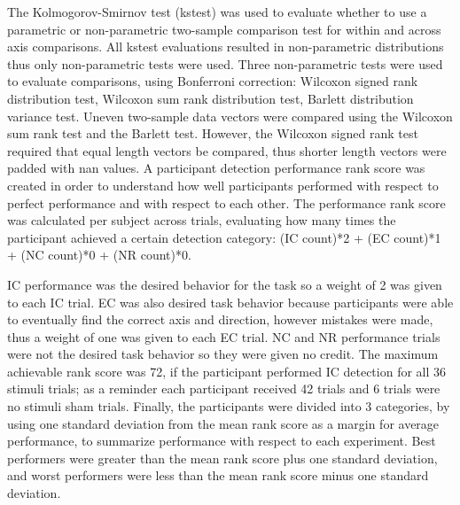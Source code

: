 \documentclass[11pt, onecolumn]{article}
\begin{document}
The Kolmogorov-Smirnov test (kstest) was used to evaluate whether to use a parametric or non-parametric two-sample comparison test for within and across axis comparisons.  All kstest evaluations resulted in non-parametric distributions thus only non-parametric tests were used.  Three non-parametric tests were used to evaluate comparisons, using Bonferroni correction: Wilcoxon signed rank distribution test, Wilcoxon sum rank distribution test, Barlett distribution variance test.  Uneven two-sample data vectors were compared using the Wilcoxon sum rank test and the Barlett test.  However, the Wilcoxon signed rank test required that equal length vectors be compared, thus shorter length vectors were padded with nan values.
A participant detection performance rank score was created in order to understand how well participants performed with respect to perfect performance and with respect to each other.  The performance rank score was calculated per subject across trials, evaluating how many times the participant achieved a certain detection category: 
(IC count)*2 + (EC count)*1 + (NC count)*0 + (NR count)*0.

IC performance was the desired behavior for the task so a weight of 2 was given to each IC trial.  EC was also desired task behavior because participants were able to eventually find the correct axis and direction, however mistakes were made, thus a weight of one was given to each EC trial.  NC and NR performance trials were not the desired task behavior so they were given no credit.  The maximum achievable rank score was 72, if the participant performed IC detection for all 36 stimuli trials; as a reminder each participant received 42 trials and 6 trials were no stimuli sham trials.  Finally, the participants were divided into 3 categories, by using one standard deviation from the mean rank score as a margin for average performance, to summarize performance with respect to each experiment. Best performers were greater than the mean rank score plus one standard deviation, and worst performers were less than the mean rank score minus one standard deviation.
\end{document}
